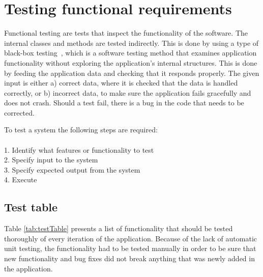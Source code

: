 \newpage
\section{Testing functional requirements}
\label{sec:funcTest}
Functional testing are tests that inspect the functionality of the software. The internal classes and methods are tested indirectly. This is done by using a type of black-box testing~\cite{blackbox}, which is a software testing method that examines application functionality without exploring the application's internal structures. This is done by feeding the application data and checking that it responds properly. The given input is either a) correct data, where it is checked that the data is handled correctly, or b) incorrect data, to make sure the application fails gracefully and does not crash. Should a test fail, there is a bug in the code that needs to be corrected.

To test a system the following steps are required:\\\\
1. Identify what features or functionality to test\\
2. Specify input to the system\\
3. Specify expected output from the system\\
4. Execute

\subsection{Test table}
Table \ref{tab:testTable} presents a list of functionality that should be tested thoroughly of every iteration of the application. Because of the lack of automatic unit testing, the functionality had to be tested manually in order to be sure that new functionality and bug fixes did not break anything that was newly added in the application.

